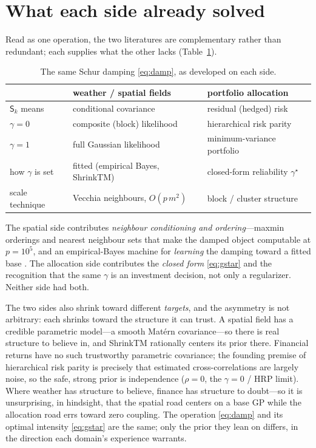 \documentclass[11pt]{article}
\newcommand{\gstar}{\gamma^\star}
\newcommand{\Sc}{\mathsf S}
\begin{document}
\section{What each side already solved}
Read as one operation, the two literatures are complementary rather than redundant; each supplies what
the other lacks (Table~\ref{tab:sides}).

\begin{table}[h]\centering\small
\caption{The same Schur damping \eqref{eq:damp}, as developed on each side.}\label{tab:sides}
\begin{tabular}{lll}
\toprule
 & weather / spatial fields & portfolio allocation\\
\midrule
$\Sc_k$ means & conditional covariance & residual (hedged) risk\\
$\gamma=0$ & composite (block) likelihood & hierarchical risk parity\\
$\gamma=1$ & full Gaussian likelihood & minimum-variance portfolio\\
how $\gamma$ is set & fitted (empirical Bayes, ShrinkTM) & closed-form reliability $\gstar$\\
scale technique & Vecchia neighbours, $O(p\,m^2)$ & block / cluster structure\\
\bottomrule
\end{tabular}
\end{table}

The spatial side contributes \emph{neighbour conditioning and ordering}---maxmin orderings and nearest
neighbour sets \citep{guinness2018} that make the damped object computable at $p=10^5$, and an
empirical-Bayes machine for \emph{learning} the damping toward a fitted base \citep{chakraborty2025}.
The allocation side contributes the \emph{closed form} \eqref{eq:gstar} and the recognition that the
same $\gamma$ is an investment decision, not only a regularizer. Neither side had both.

The two sides also shrink toward different \emph{targets}, and the asymmetry is not arbitrary: each
shrinks toward the structure it can trust. A spatial field has a credible parametric model---a smooth
Mat\'ern covariance---so there is real structure to believe in, and ShrinkTM rationally centers its
prior there. Financial returns have no such trustworthy parametric covariance; the founding premise of
hierarchical risk parity is precisely that estimated cross-correlations are largely noise, so the safe,
strong prior is independence ($\rho=0$, the $\gamma=0$ / HRP limit). Where weather has structure to
believe, finance has structure to doubt---so it is unsurprising, in hindsight, that the spatial road
centers on a base GP while the allocation road errs toward zero coupling. The operation
\eqref{eq:damp} and its optimal intensity \eqref{eq:gstar} are the same; only the prior they lean on
differs, in the direction each domain's experience warrants.
\end{document}
